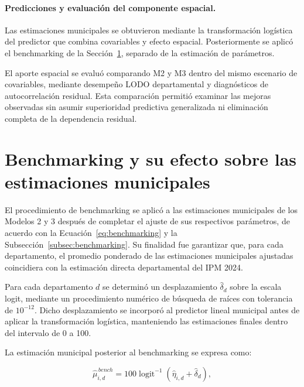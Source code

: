 \paragraph{Predicciones y evaluación del componente espacial.}

Las estimaciones municipales se obtuvieron mediante la transformación logística del predictor que combina covariables y efecto espacial. Posteriormente se aplicó el benchmarking de la Sección~\ref{sec:met-benchmarking}, separado de la estimación de parámetros.

El aporte espacial se evaluó comparando M2 y M3 dentro del mismo escenario de covariables, mediante desempeño LODO departamental y diagnósticos de autocorrelación residual. Esta comparación permitió examinar las mejoras observadas sin asumir superioridad predictiva generalizada ni eliminación completa de la dependencia residual.


\section{Benchmarking y su efecto sobre las estimaciones municipales}
\label{sec:met-benchmarking}

El procedimiento de benchmarking se aplicó a las estimaciones municipales de los Modelos 2 y 3 después de completar el ajuste de sus respectivos parámetros, de acuerdo con la Ecuación~\ref{eq:benchmarking} y la Subsección~\ref{subsec:benchmarking}. Su finalidad fue garantizar que, para cada departamento, el promedio ponderado de las estimaciones municipales ajustadas coincidiera con la estimación directa departamental del IPM 2024.

Para cada departamento $d$ se determinó un desplazamiento $\hat{\delta}_d$ sobre la escala logit, mediante un procedimiento numérico de búsqueda de raíces con tolerancia de $10^{-12}$. Dicho desplazamiento se incorporó al predictor lineal municipal antes de aplicar la transformación logística, manteniendo las estimaciones finales dentro del intervalo de 0 a 100.

La estimación municipal posterior al benchmarking se expresa como:

\begin{equation}
\widehat{\mu}_{i,d}^{\,bench}
=
100\operatorname{logit}^{-1}
\left(
\widehat{\eta}_{i,d}+\widehat{\delta}_d
\right),
\label{eq:met-benchmark-municipal}
\end{equation}


